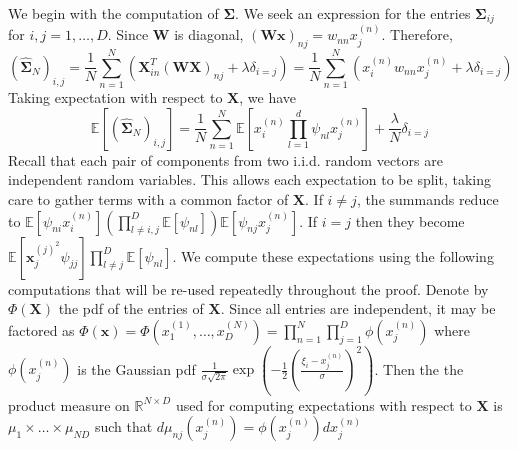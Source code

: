             We begin with the computation of $\mathbf{\Sigma}$. We seek an expression for the entries $\mathbf{\Sigma}_{ij}$ for $i,j=1,\ldots,D$. Since $\mathbf{W}$ is diagonal, $(\mathbf{W}\mathbf{x})_{nj} = w_{nn}x^{(n)}_j$. Therefore,
            \begin{equation*}
                (\hat{\mathbf{\Sigma}}_N)_{i,j}  = \frac{1}{N} \sum_{n=1}^N (\mathbf{X}^T_{in}(\mathbf{W}\mathbf{X})_{nj} + \lambda \delta_{i=j}) = \frac{1}{N}\sum_{n=1}^N (x^{(n)}_i w_{nn} x^{(n)}_j + \lambda \delta_{i=j})
            \end{equation*}
            Taking expectation with respect to $\mathbf{X}$, we have
            \begin{equation*}
                \mathds{E}[(\hat{\mathbf{\Sigma}}_N)_{i,j}] = \frac{1}{N}\sum_{n=1}^N \mathds{E}[x^{(n)}_i\prod_{l=1}^d \psi_{nl} x^{(n)}_j] + \frac{\lambda}{N} \delta_{i=j}
            \end{equation*}
            Recall that each pair of components from two i.i.d. random vectors are independent random variables. This allows each expectation to be split, taking care to gather terms with a common factor of $\mathbf{X}$. 
            If $i\neq j$, the summands reduce to $\mathds{E}[\psi_{ni}x^{(n)}_i] (\prod_{l\neq i,j}^D \mathds{E}[\psi_{nl}]) \mathds{E}[\psi_{nj}x^{(n)}_j]$. If $i=j$ then they become $\mathds{E}[\mathbf{x}^{{(j)}^2}_j \psi_{jj}] \prod_{l\neq j}^D \mathds{E}[\psi_{nl}]$. We compute these expectations using the following computations that will be re-used repeatedly throughout the proof. Denote by $\Phi(\mathbf{X})$ the pdf of the entries of $\mathbf{X}$. Since all entries are independent, it may be factored as $\Phi(\mathbf{x}) = \Phi(x^{(1)}_1,\ldots,x^{(N)}_D) = \prod_{n=1}^N \prod_{j=1}^D \phi(x^{(n)}_j)$ where $\phi(x^{(n)}_j)$ is the Gaussian pdf $\frac{1}{\sigma \sqrt{2\pi}}\exp\left(-\frac{1}{2}\left(\frac{\xi_i-x^{(n)}_j}{\sigma}\right)^2\right)$. Then the the product measure on $\mathbb{R}^{N\times D}$ used for computing expectations with respect to $\mathbf{X}$ is $\mu_1 \times \ldots \times \mu_{ND}$ such that $d\mu_{nj}(x^{(n)}_j) = \phi(x^{(n)}_j)dx^{(n)}_j$

